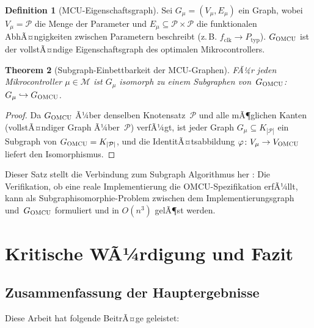 ﻿\documentclass[12pt, a4paper]{article}
\theoremstyle{plain}
\newtheorem{theorem}{Theorem}[section]
\theoremstyle{definition}
\newtheorem{definition}[theorem]{Definition}
\theoremstyle{remark}
\newcommand{\omcu}{\textsc{OMCU}}
\begin{document}
\begin{definition}[MCU-Eigenschaftsgraph]
\label{def:eigenschaftsgraph}
  Sei $G_\mu = (V_\mu, E_\mu)$ ein Graph, wobei
  $V_\mu = \mathcal{P}$ die Menge der Parameter und
  $E_\mu \subseteq \mathcal{P} \times \mathcal{P}$ die
  funktionalen AbhÃ¤ngigkeiten zwischen Parametern beschreibt
  (z.\,B. $f_\text{clk} \to P_\text{typ}$).
  $G_{\omcu{}}$ ist der vollstÃ¤ndige Eigenschaftsgraph des optimalen
  Mikrocontrollers.
\end{definition}

\begin{theorem}[Subgraph-Einbettbarkeit der MCU-Graphen]
\label{thm:subgraph}
  FÃ¼r jeden Mikrocontroller $\mu \in \mathcal{M}$ ist $G_\mu$
  isomorph zu einem Subgraphen von~$G_{\omcu{}}$:
  $G_\mu \hookrightarrow G_{\omcu{}}$.
\end{theorem}

\begin{proof}
  Da $G_{\omcu{}}$ Ã¼ber denselben Knotensatz~$\mathcal{P}$ und alle
  mÃ¶glichen Kanten (vollstÃ¤ndiger Graph Ã¼ber~$\mathcal{P}$) verfÃ¼gt,
  ist jeder Graph $G_\mu \subseteq K_{|\mathcal{P}|}$ ein Subgraph von
  $G_{\omcu{}} = K_{|\mathcal{P}|}$, und die IdentitÃ¤tsabbildung
  $\varphi\colon V_\mu \to V_{\omcu{}}$ liefert den Isomorphismus.
 
\end{proof}

Dieser Satz stellt die Verbindung zum Subgraph Algorithmus her
\cite{epp_subgraph2026}:
Die Verifikation, ob eine reale Implementierung die OMCU-Spezifikation
erfÃ¼llt, kann als Subgraphiso\-morphie-Problem zwischen dem
Implementierungsgraph und~$G_{\omcu{}}$ formuliert und in
$O(n^3)$ gelÃ¶st werden.

\section{Kritische WÃ¼rdigung und Fazit}
\label{sec:fazit}

\subsection{Zusammenfassung der Hauptergebnisse}

Diese Arbeit hat folgende BeitrÃ¤ge geleistet:
\end{document}
